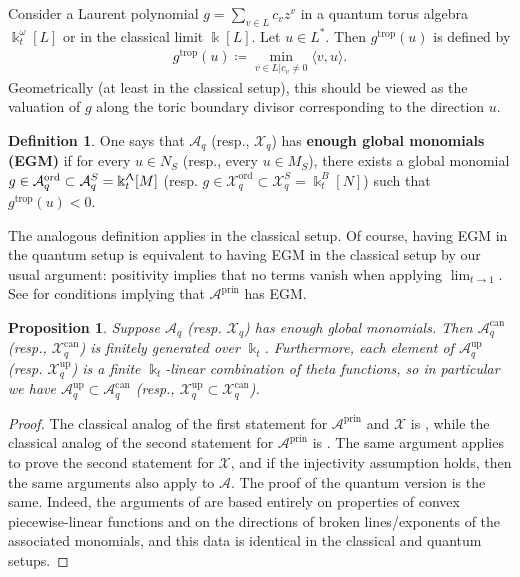 \documentclass{amsart}
\DeclareMathOperator{\trop}{trop}
\DeclareMathOperator{\prin}{prin}
\DeclareMathOperator{\up}{up}
\DeclareMathOperator{\ord}{ord}
\DeclareMathOperator{\can}{can}
\let\rar=\rightarrow
\let\s=\mathcal
\newcommand {\kk} {\Bbbk}
\newcommand {\kt} {\kk_t}
\renewcommand{\Lambda}{\Uplambda}
\theoremstyle{plain}%
\newtheorem{prop}[thm]{Proposition}
\theoremstyle{definition}
\newtheorem{dfn}[thm]{Definition}
\theoremstyle{remark}
\begin{document}
Consider a Laurent polynomial $g=\sum_{v\in L} c_vz^v$ in a quantum torus algebra $\kk_t^{\omega}[L]$ or in the classical limit $\kk[L]$.  Let $u\in L^*$.  Then $g^{\trop}(u)$ is defined by
\begin{align*}
    g^{\trop}(u)\coloneqq \min_{v\in L|c_v\neq 0} \langle v,u\rangle.
\end{align*}
Geometrically (at least in the classical setup), this should be viewed as the valuation of $g$ along the toric boundary divisor corresponding to the direction $u$.

\begin{dfn}\label{EGMdef}
One says that $\s{A}_q$ (resp., $\s{X}_q$) has \textbf{enough global monomials (EGM)} if for every $u\in N_S$ (resp., every $u\in M_S$), there exists a global monomial $g\in \s{A}_q^{\ord}\subset \s{A}_q^S= \kk_t^{\Lambda}[M]$ (resp. $g\in \s{X}_q^{\ord}\subset \s{X}_q^S=\kk_t^{B}[N]$) such that $g^{\trop}(u)< 0$.
\end{dfn}
The analogous definition applies in the classical setup.  Of course, having EGM in the quantum setup is equivalent to having EGM in the classical setup by our usual argument: positivity implies that no terms vanish when applying $\lim_{t\rar 1}$.  See \cite[Prop. 0.14]{GHKK} for conditions implying that $\s{A}^{\prin}$ has EGM.

\begin{prop}\label{canEGM}
Suppose $\s{A}_q$ (resp. $\s{X}_q$) has enough global monomials.  Then $\s{A}_q^{\can}$ (resp., $\s{X}^{\can}_q$) is finitely generated over $\kt$.  Furthermore, each element of $\s{A}_q^{\up}$ (resp. $\s{X}_q^{\up}$) is a finite $\kk_t$-linear combination of theta functions, so in particular we have  $\s{A}_q^{\up} \subset \s{A}_q^{\can}$ (resp., $\s{X}_q^{\up}\subset \s{X}_q^{\can}$).
\end{prop}
\begin{proof}
The classical analog of the first statement for $\s{A}^{\prin}$ and $\s{X}$ is \cite[Cor. 8.21]{GHKK}, 
while the classical analog of the second statement for $\s{A}^{\prin}$ is \cite[Prop. 8.22]{GHKK}.  The same argument applies to prove the second statement for $\s{X}$, and if the injectivity assumption holds, then the same arguments also apply to $\s{A}$.  The proof of the quantum version is the same.  Indeed, the arguments of \cite[\S 8.1-\S 8.3]{GHKK} are based entirely on properties of convex piecewise-linear functions and on the directions of broken lines/exponents of the associated monomials, and this data is identical in the classical and quantum setups.
\end{proof}
\end{document}
